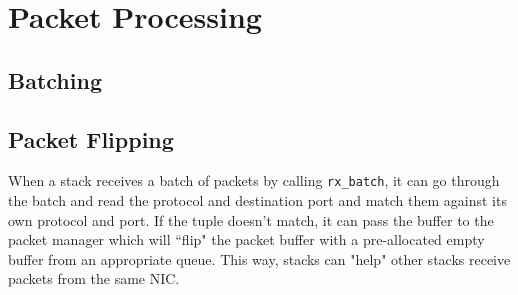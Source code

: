 \section{Packet Processing}

\subsection*{Batching}

\subsection{Packet Flipping}
When a stack receives a batch of packets by calling \lstinline{rx_batch}, it can go through the batch and read the protocol and destination port and match them against its own protocol and port. If the tuple doesn't match, it can pass the buffer to the packet manager which will ``flip" the packet buffer with a pre-allocated empty buffer from an appropriate queue. This way, stacks can "help" other stacks receive packets from the same NIC.
